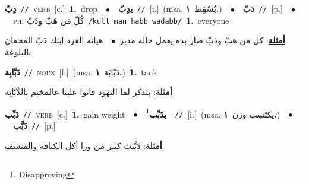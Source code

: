 \documentclass[10pt,a4paper,twoside]{article} %
\begin{document}
\begin{multicols}{2}
{\setlength\topsep{0pt}\textbf{\foreignlanguage{arabic}{دِبّ}}\ {\color{gray}\texttt{//}\color{black}}\ \textsc{verb}\ [c.]\ \textbf{1.}~drop\ \ $\bullet$\ \ \setlength\topsep{0pt}\textbf{\foreignlanguage{arabic}{يدِبّ}}\ {\color{gray}\texttt{//}\color{black}}\ [i.]\ \color{gray}(msa. \foreignlanguage{arabic}{يُسْقِط}~\foreignlanguage{arabic}{\textbf{١.}})\color{black}\ \ $\bullet$\ \ \setlength\topsep{0pt}\textbf{\foreignlanguage{arabic}{دَبّ}}\ {\color{gray}\texttt{//}\color{black}}\ [p.]\ \ $\bullet$\ \ \textsc{ph.} \color{gray} \foreignlanguage{arabic}{كُلّ مَن هَبّ ودَبّ}\color{black}\ {\color{gray}\texttt{/{\sffamily kull man habb wadabb}/}\color{black}}\ \textbf{1.}~everyone\  \begin{flushright}\color{gray}\foreignlanguage{arabic}{\textbf{\underline{\foreignlanguage{arabic}{أمثلة}}}: كل من هبّ ودَبّ صار بده يعمل حاله مدير\ $\bullet$\ \  هياته القرد ابنك دَبّ المحقان بالبلوعة}\end{flushright}\color{black}} \vspace{2mm}

{\setlength\topsep{0pt}\textbf{\foreignlanguage{arabic}{دَبَّابِة}}\ {\color{gray}\texttt{//}\color{black}}\ \textsc{noun}\ [f.]\ \color{gray}(msa. \foreignlanguage{arabic}{دَبّابَة}~\foreignlanguage{arabic}{\textbf{١.}})\color{black}\ \textbf{1.}~tank\  \begin{flushright}\color{gray}\foreignlanguage{arabic}{\textbf{\underline{\foreignlanguage{arabic}{أمثلة}}}: بتذكر لما اليهود فاتوا علينا عالمخيم بالدَّبّابِة}\end{flushright}\color{black}} \vspace{2mm}

{\setlength\topsep{0pt}\textbf{\foreignlanguage{arabic}{دَبِّب}}\ {\color{gray}\texttt{//}\color{black}}\ \textsc{verb}\ [c.]\ \textbf{1.}~gain weight\ \ $\bullet$\ \ \setlength\topsep{0pt}\textbf{\foreignlanguage{arabic}{يدَبِّب}}\footnote{Disapproving}\ \ {\color{gray}\texttt{//}\color{black}}\ [i.]\ \color{gray}(msa. \foreignlanguage{arabic}{يكتَسِب وزن}~\foreignlanguage{arabic}{\textbf{١.}})\color{black}\ \ $\bullet$\ \ \setlength\topsep{0pt}\textbf{\foreignlanguage{arabic}{دَبَّب}}\ {\color{gray}\texttt{//}\color{black}}\ [p.]\  \begin{flushright}\color{gray}\foreignlanguage{arabic}{\textbf{\underline{\foreignlanguage{arabic}{أمثلة}}}: دَبَّبت كثير من ورا أكل الكنافة والمنسف}\end{flushright}\color{black}} \vspace{2mm}


\end{multicols}
\end{document}
